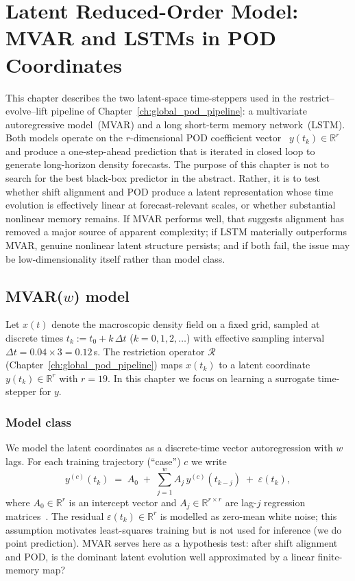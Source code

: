 \chapter{Latent Reduced-Order Model: MVAR and LSTMs in POD Coordinates}
\label{ch:latent_rom}

This chapter describes the two latent-space time-steppers used in the
restrict--evolve--lift pipeline of Chapter~\ref{ch:global_pod_pipeline}:
a multivariate autoregressive model~(MVAR) and a long short-term memory
network~(LSTM).
Both models operate on the $r$-dimensional POD coefficient
vector~\cite{berkooz1993pod}
$y(t_k)\in\mathbb{R}^r$ and produce a one-step-ahead prediction that is
iterated in closed loop to generate long-horizon density forecasts.
The purpose of this chapter is not to search for the best black-box
predictor in the abstract.  Rather, it is to test whether shift alignment
and POD produce a latent representation whose time evolution is effectively
linear at forecast-relevant scales, or whether substantial nonlinear memory
remains.  If MVAR performs well, that suggests alignment has removed a major
source of apparent complexity; if LSTM materially outperforms MVAR, genuine
nonlinear latent structure persists; and if both fail, the issue may be
low-dimensionality itself rather than model class.

\section{MVAR(\texorpdfstring{$w$}{w}) model}
\label{sec:mvar_definition}

Let $x(t)$ denote the macroscopic density field on a fixed grid, sampled at
discrete times $t_k := t_0 + k\,\Delta t$ ($k = 0,1,2,\dots$) with effective sampling interval
$\Delta t = 0.04\times 3 = 0.12$\,s.
The restriction operator $\mathcal{R}$ (Chapter~\ref{ch:global_pod_pipeline}) maps
$x(t_k)$ to a latent coordinate $y(t_k)\in\mathbb{R}^r$ with
$r=19$.
In this chapter we focus on learning a surrogate time-stepper for $y$.

\subsection{Model class}
We model the latent coordinates as a discrete-time vector autoregression with
$w$ lags.
For each training trajectory (``case'') $c$ we write
\begin{equation}\label{eq:mvar_def}
  y^{(c)}(t_k) \;=\; A_0 \;+\; \sum_{j=1}^{w} A_j\,y^{(c)}(t_{k-j})
                 \;+\; \varepsilon(t_k),
\end{equation}
where $A_0\in\mathbb{R}^r$ is an intercept vector and
$A_j\in\mathbb{R}^{r\times r}$ are lag-$j$ regression matrices~\cite{alvarez2025eqfree}.
The residual $\varepsilon(t_k)\in\mathbb{R}^r$ is modelled as zero-mean
white noise; this assumption motivates least-squares training but is not
used for inference (we do point prediction).
MVAR serves here as a hypothesis test: after shift alignment and POD, is
the dominant latent evolution well approximated by a linear finite-memory
map?

